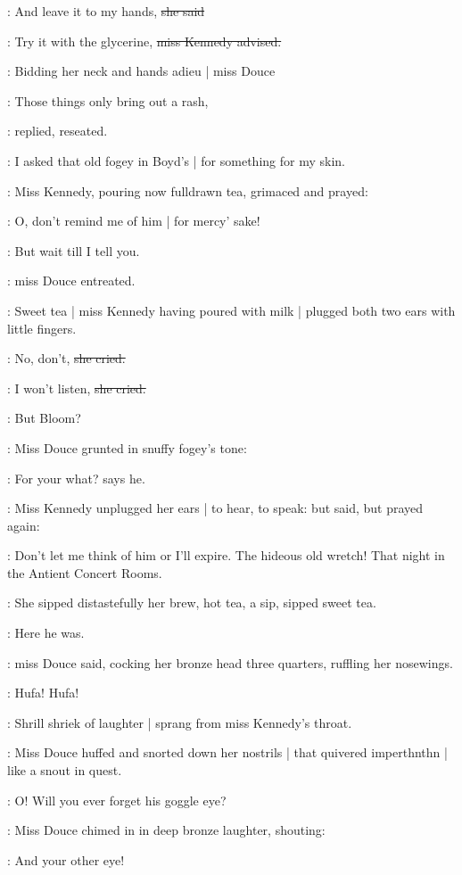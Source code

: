 \MissD:
And leave it to my hands,
\sout{she said}

\MissK:
Try it with the glycerine,
\sout{miss Kennedy advised.}

:
Bidding her neck and hands adieu |
miss Douce

\MissD:
Those things only bring out a rash,

:
replied,
reseated.

\MissD:
I asked that old fogey in Boyd's |
for something for my skin.

:
Miss Kennedy,
pouring now fulldrawn tea,
grimaced and prayed:

\MissK:
O, don't remind me of him |
for mercy' sake!

\MissD:
But wait till I tell you.

:
miss Douce entreated.

:
Sweet tea |
miss Kennedy having poured with milk |
plugged both two ears
with little fingers.

\MissK:
No,
don't,
\sout{she cried.}

\MissK:
I won't listen,
\sout{she cried.}

:
But Bloom?

:
Miss Douce grunted in snuffy fogey's tone:

\MissD:
For your what?
says he.

:
Miss Kennedy unplugged her ears |
to hear,
to speak:
but said,
but prayed again:

\MissK:
Don't let me think of him or I'll expire.
The hideous old wretch!
That night in the Antient Concert Rooms.

:
She sipped distastefully her brew,
hot tea,
a sip,
sipped sweet tea.

\MissD:
Here he was.

:
miss Douce said,
cocking her bronze head three quarters,
ruffling her nosewings.

\MissD:
Hufa!
Hufa!

:
Shrill shriek of laughter |
sprang from miss Kennedy's throat.

:
Miss Douce huffed and snorted down her nostrils |
that quivered imperthnthn |
like a snout in quest.

\MissK:
O!
\stage{[shrieking]}
Will you ever forget his goggle eye?

:
Miss Douce chimed in in deep bronze laughter,
shouting:

\MissD:
And your other eye!

